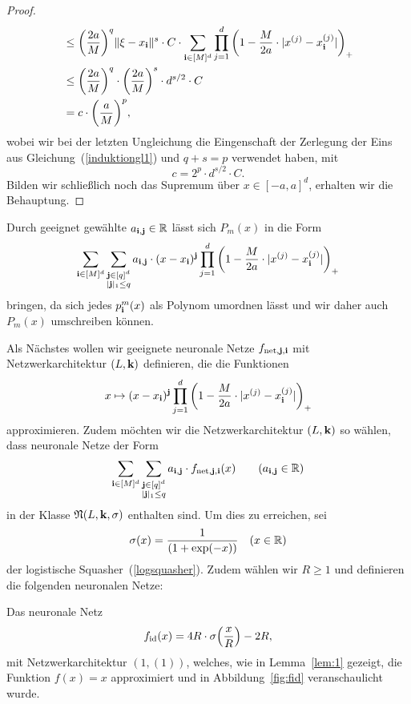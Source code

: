 \begin{proof}
\begin{equation*}
\begin{split}
& \leq \bigg(\frac{2a}{M}\bigg)^q \|\xi - x_{\mathbf{i}} \|^s \cdot C \cdot \sum_{\mathbf{i} \in [M]^d} \prod_{j = 1}^d \bigg(1 - \frac{M}{2a} \cdot |x^{(j)} - x_{\mathbf{i}}^{(j)}|\bigg)_+ \\
& \leq \bigg(\frac{2a}{M}\bigg)^q \cdot \bigg(\frac{2a}{M}\bigg)^s \cdot d^{s/2} \cdot C\\
& = c \cdot \bigg(\frac{a}{M}\bigg)^p,
\end{split}
\end{equation*}
wobei wir bei der letzten Ungleichung die Eingenschaft der Zerlegung der Eins aus Gleichung~(\ref{induktiongl1}) und $q + s = p$ verwendet haben, mit 
$$c = 2^p \cdot d^{s/2} \cdot C.$$
Bilden wir schließlich noch das Supremum über $x \in [-a, a]^d$, erhalten wir die Behauptung.
\end{proof}

Durch geeignet gewählte $a_{\mathbf{i}, \mathbf{j}} \in \mathbb{R}$ lässt sich $P_m(x)$ in die Form 
$$\sum_{\mathbf{i} \in [M]^d} \sum_{\substack{ \mathbf{j} \in [q]^d\\|\mathbf{j}|_1 \leq q}} a_{\mathbf{i}, \mathbf{j}} \cdot (x - x_{\mathbf{i}})^{\mathbf{j}} \prod_{j = 1}^d \bigg(1 - \frac{M}{2a} \cdot |x^{(j)} - x_{\mathbf{i}}^{(j)}|\bigg)_+$$
bringen, da sich jedes $p^m_{\mathbf{i}}(x)$ als Polynom umordnen lässt und wir daher auch $P_m(x)$ umschreiben können.

Als Nächstes wollen wir geeignete neuronale Netze $f_{\mathrm{net}, \mathbf{j}, \mathbf{i}}$ mit Netzwerkarchitektur $(L, \mathbf{k})$ definieren, die die Funktionen
$$x \mapsto (x - x_{\mathbf{i}})^{\mathbf{j}} \prod_{j = 1}^d \bigg(1 - \frac{M}{2a} \cdot |x^{(j)} - x_{\mathbf{i}}^{(j)}|\bigg)_+$$ approximieren. Zudem möchten wir die Netzwerkarchitektur $(L, \mathbf{k})$ so wählen, dass neuronale Netze der Form
$$\sum_{\mathbf{i} \in [M]^d} \sum_{\substack{ \mathbf{j} \in [q]^d\\|\mathbf{j}|_1 \leq q}} a_{\mathbf{i}, \mathbf{j}} \cdot f_{\mathrm{net},\mathbf{j},\mathbf{i}}(x) \qquad (a_{\mathbf{i},\mathbf{j}} \in \mathbb{R})$$ in der Klasse $\mathfrak{N}(L, \mathbf{k}, \sigma)$ enthalten sind.
Um dies zu erreichen, sei $$\sigma(x) = \frac{1}{(1 + \exp(-x))} \quad (x \in \mathbb{R})$$ der logistische Squasher~(\ref{logsquasher}). Zudem wählen wir $R \geq 1$ und definieren die folgenden neuronalen Netze:

Das neuronale Netz
\begin{equation}
\label{def:fid}
f_{\mathrm{id}}(x) = 4R \cdot \sigma\Big(\frac{x}{R}\Big) - 2R,
\end{equation}
mit Netzwerkarchitektur $(1, (1))$, welches, wie in Lemma~\ref{lem:1} gezeigt, die Funktion $f(x) = x$ approximiert und in Abbildung~\ref{fig:fid} veranschaulicht wurde.


